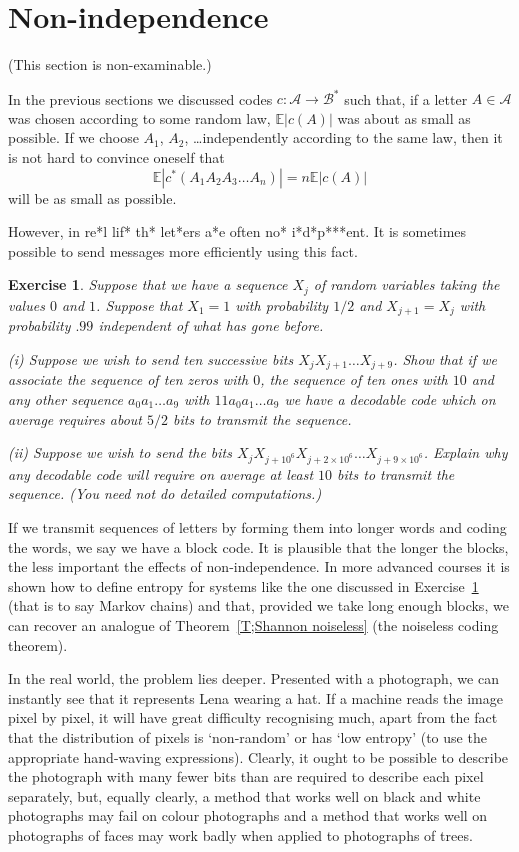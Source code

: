 \documentclass[12pt,a4paper]{article}
\theoremstyle{plain}
\newtheorem{exercise}[theorem]{Exercise}
\theoremstyle{definition}
\begin{document}
\section{Non-independence}

(This section is non-examinable.)

In the previous sections we discussed codes
$c:{\mathcal A}\rightarrow{\mathcal B}^{*}$
such that, if a letter $A\in{\mathcal A}$ was chosen according to
some random law, ${\mathbb E}|c(A)|$ was about
as small as possible. If we choose $A_{1}$, $A_{2}$,
\dots independently according to the same law,
then it is not hard to convince oneself that
\[{\mathbb E}|c^{*}(A_{1}A_{2}A_{3}\dots A_{n})|
=n{\mathbb E}|c(A)|\]
will be as small as possible.

However, in re*l lif* th* let*ers a*e 
often no* i*d*p***ent. It is sometimes possible
to send messages more
efficiently using this fact.
\begin{exercise}\label{E;Markov} 
Suppose that we have a sequence
$X_{j}$ of random variables taking the values
$0$ and $1$. Suppose that $X_{1}=1$ with probability $1/2$
and
$X_{j+1}=X_{j}$ with probability
$.99$ independent of what has gone before.

(i) Suppose we wish to send ten successive bits
$X_{j}X_{j+1}\dots X_{j+9}$. Show that if we associate
the sequence of ten zeros with $0$, the sequence
of ten ones with $10$ and any other sequence
$a_{0}a_{1}\dots a_{9}$ with $11a_{0}a_{1}\dots a_{9}$
we have a decodable code which on average requires 
about $5/2$ bits to transmit the sequence.

(ii) Suppose we wish to send the bits
$X_{j}X_{j+10^{6}}X_{j+2\times 10^{6}}\dots X_{j+9\times 10^{6}}$. 
Explain why any decodable code will require
on average at least $10$ bits to transmit the sequence.
(You need not do detailed computations.)
\end{exercise}

If we transmit sequences of letters by forming
them into longer words and coding the words,
we say we have a block code. It is plausible that
the longer the blocks, the less important the
effects of non-independence. In more advanced courses
it is shown how to define entropy for systems
like the one discussed in Exercise~\ref{E;Markov}
(that is to say Markov chains) and that, provided
we take long enough blocks, we can recover
an analogue of Theorem~\ref{T;Shannon noiseless}
(the noiseless coding theorem).

In the real world, the problem lies deeper.
Presented with a photograph, we can instantly
see that it represents Lena wearing a hat.
If a machine reads the image pixel by pixel,
it will have great difficulty recognising
much, apart from the fact that the distribution
of pixels is `non-random' or has `low entropy'
(to use the appropriate hand-waving expressions).
Clearly, it ought to be possible to describe the photograph
with many fewer bits than are required to describe
each pixel separately, but, equally clearly, 
a method that works well on black and white photographs
may fail on colour photographs and a method that works well
on photographs of faces may work badly 
when applied to photographs  
of trees.
\end{document}
